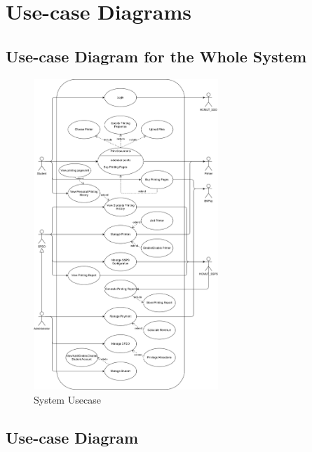 \section{Use-case Diagrams}
\subsection{Use-case Diagram for the Whole System}
\begin{figure}[htbp]
	\centering
	\includegraphics[width=0.62\textwidth]{Images/Usecases/System_usecase.png}
	\caption{\fontsize{12pt}{0pt}\selectfont System Usecase}
\end{figure}
\newpage


\subsection{Use-case Diagram}
